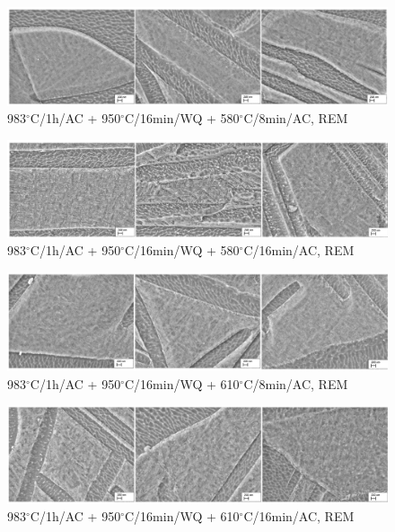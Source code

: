 \begin{figure}[h]
	\centering
	\includegraphics[width=1.0\linewidth]{./Bilder/Abbildung 22.png}
	\caption[Abbildung 22]{983$^\circ$C/1h/AC + 950$^\circ$C/16min/WQ + 580$^\circ$C/8min/AC, REM}
	\label{fig:abbildung-22}
\end{figure}

\begin{figure}[h]
	\centering
	\includegraphics[width=1.0\linewidth]{./Bilder/Abbildung 23.png}
	\caption[Abbildung 23]{983$^\circ$C/1h/AC + 950$^\circ$C/16min/WQ + 580$^\circ$C/16min/AC, REM}
	\label{fig:abbildung-23}
\end{figure}

\begin{figure}[h]
	\centering
	\includegraphics[width=1.0\linewidth]{./Bilder/Abbildung 24.png}
	\caption[Abbildung 24]{983$^\circ$C/1h/AC + 950$^\circ$C/16min/WQ + 610$^\circ$C/8min/AC, REM}
	\label{fig:abbildung-24}
\end{figure}

\begin{figure}[h]
	\centering
	\includegraphics[width=1.0\linewidth]{./Bilder/Abbildung 25.png}
	\caption[Abbildung 25]{983$^\circ$C/1h/AC + 950$^\circ$C/16min/WQ + 610$^\circ$C/16min/AC, REM}
	\label{fig:abbildung-25}
\end{figure}

